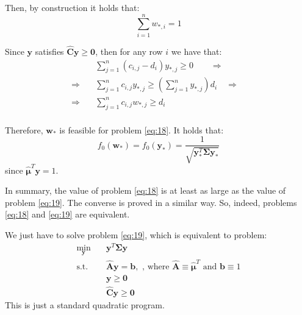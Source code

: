 \documentclass{beamer}
\begin{document}
\begin{frame}

\justifying
Then, by construction it holds that:
$$
\sum_{i=1}^{n}w_{*,i} = 1
$$

\vspace{0.4cm}
\justifying
Since $\mathbf{y}$ satisfies $\hat{\mathbf{C}}\mathbf{y} \geq \mathbf{0}$, then for any row $i$ we have that:
\begin{align*}
	& \sum_{j=1}^{n} \left( c_{i,j} - d_{i} \right) y_{*,j} \geq 0 \qquad \Rightarrow &\\
	\Rightarrow \quad & \sum_{j=1}^{n} c_{i,j}y_{*,j} \geq \left(\sum_{j=1}^{n}y_{*,j}\right)d_{i} \quad \Rightarrow &\\
	\Rightarrow \quad & \sum_{j=1}^{n} c_{i,j}w_{*,j} \geq d_{i} & \\
\end{align*}

\end{frame}




\begin{frame}

\justifying
Therefore, $\mathbf{w}_{*}$ is feasible for problem \eqref{eq:18}. It holds that:
$$
f_{0}\left(\mathbf{w}_{*}\right) = f_{0}\left(\mathbf{y}_{*}\right) = \frac{1}{\sqrt{\mathbf{y}_{*}^{T}\mathbf{\Sigma}\mathbf{y}_{*}}}
$$
since $\hat{\boldsymbol\mu}^{T}\mathbf{y} = 1$.

\vspace{0.4cm}
\justifying
In summary, the value of problem \eqref{eq:18} is at least as large as the value of problem \eqref{eq:19}. The converse is proved in a similar way. So, indeed, problems \eqref{eq:18} and  \eqref{eq:19} are equivalent.

\vspace{0.4cm}
\justifying
We just have to solve problem \eqref{eq:19}, which is equivalent to problem:
\justifying
\begin{equation}
\begin{aligned}
\label{eq:20}
\min_{\mathbf{y}} \quad & \mathbf{y}^{T}\mathbf{\Sigma}\mathbf{y} \\
\textrm{s.t.} \quad & \hat{\mathbf{A}} \mathbf{y} = \mathbf{b}, \textrm{ , where } \hat{\mathbf{A}} \equiv \hat{\boldsymbol\mu}^{T} \textrm{ and } \mathbf{b} \equiv 1  \\
                             & \mathbf{y} \geq \mathbf{0} \\
                             & \hat{\mathbf{C}}\mathbf{y} \geq \mathbf{0}
\end{aligned}
\end{equation}
\justifying
This is just a standard quadratic program.

\end{frame}
\end{document}
